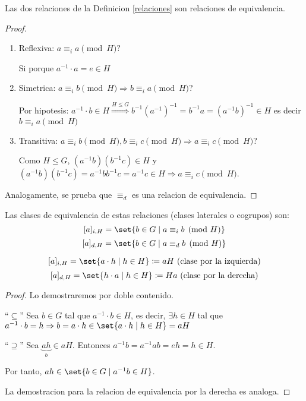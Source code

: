 \begin{proposition}
	Las dos relaciones de la Definicion \ref{relaciones} son relaciones de equivalencia.
\end{proposition}
\begin{proof}
	\begin{enumerate}
		\item Reflexiva: \(a \equiv_i a \pmod H ?\)
		      
		      Si porque \(a^{-1} \cdot a = e \in H \)
		      
		\item Simetrica: \(a \equiv_i b \pmod H \Rightarrow b \equiv_i a \pmod H \)?
		      
		      Por hipotesis: \(a^{-1}  \cdot b \in H \overset{H \leq G}{\Rightarrow} b^{-1} (a^{-1} )^{-1} = b^{-1} a = (a^{-1} b )^{-1} \in H\) es decir \(b \equiv_i a \pmod H \)
		      
		\item Transitiva: \(a \equiv_i b \pmod H, b \equiv_i c \pmod H \Rightarrow a \equiv_i c \pmod H \)?
		      
		      Como \(H \leq G \), \((a^{-1} b)(b^{-1} c) \in H \) y \((a^{-1} b)(b^{-1} c) = a^{-1} b b^{-1} c = a^{-1} c \in H \Rightarrow a\equiv_i c \pmod H \).
	\end{enumerate}
	Analogamente, se prueba que \(\equiv_d \) es una relacion de equivalencia.
\end{proof}

Las clases de equivalencia de estas relaciones (clases laterales o cogrupos) son:
\[
	[a]_{i,H} = \set{b \in G \mid a \equiv_i b \pmod H}
\]
\[
	[a]_{d,H} = \set{b \in G \mid a\equiv_d b \pmod H }
\]

\begin{proposition}
	\[
		[a]_{i,H} = \set{a \cdot h \mid h \in H } \coloneqq aH \text{ (clase por la izquierda)}
	\]
	\[
		[a]_{d,H} = \set{h \cdot a \mid h \in H } \coloneqq Ha \text{ (clase por la derecha)}
	\]
\end{proposition}
\begin{proof}
	Lo demostraremos por doble contenido.
	
	``\(\subseteq \)'' Sea \(b \in G \) tal que \(a^{-1} \cdot b \in H \), es decir, \(\exists h \in H \) tal que \(a^{-1} \cdot b = h \Rightarrow b = a \cdot h \in \set{a \cdot h \mid h \in H} = aH \)
	
	``\(\supseteq\)'' Sea \(\underbrace{ah}_{b} \in aH \). Entonces \(a^{-1} b = a^{-1}  a b = eh = h \in H \).
	
	Por tanto, \(ah \in \set{b \in G \mid a^{-1} b \in H }\).
	
	La demostracion para la relacion de equivalencia por la derecha es analoga.
\end{proof}

